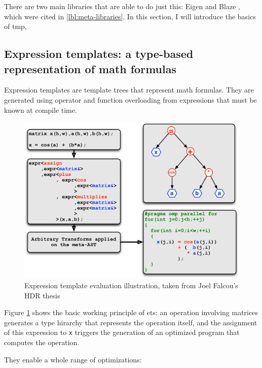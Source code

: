 \documentclass[../main]{subfiles}
\begin{document}
There are two main libraries that are able to do just this: Eigen \cite{eigen}
and Blaze \cite{blazelib}, which were cited in \ref{lbl:meta-libraries}.
In this section, I will introduce the basics of \cpp \gls{tmp},

\subsection{
  Expression templates: a type-based representation of math formulas
}

Expression templates are template trees that represent math formulas.
They are generated using operator and function overloading from expressions
that must be known at compile time.

\begin{figure}[h]
\includegraphics[width=\textwidth]{images/expressiontemplates.pdf}
\caption{
  Expression template evaluation illustration,
  taken from Joel Falcou's HDR thesis \cite{falcou-hdr}
}
\label{fig:expression-template-illustration}
\end{figure}

Figure \ref{fig:expression-template-illustration} shows the basic
working principle of \glspl{et}: an operation involving matrices generates
a type hirarchy that represents the operation itself, and the assignment
of this expression to \lstinline{x} triggers the generation of
an optimized program that computes the operation.

They enable a whole range of optimizations:
\end{document}

